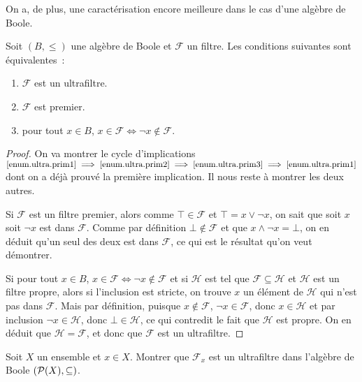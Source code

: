 On a, de plus, une caractérisation encore meilleure dans le cas d'une algèbre de
Boole.

\begin{proposition}
  Soit $(B,\leq)$ une algèbre de Boole et $\mathcal F$ un filtre. Les conditions
  suivantes sont équivalentes~:
  \begin{enumerate}[label=(\roman*)]
  \item \label{enum.ultra.prim1} $\mathcal F$ est un ultrafiltre.
  \item \label{enum.ultra.prim2} $\mathcal F$ est premier.
  \item \label{enum.ultra.prim3} pour tout $x\in B$,
    $x\in \mathcal F \iff \lnot x \notin\mathcal F$.
  \end{enumerate}
\end{proposition}

\begin{proof}
  On va montrer le cycle d'implications
  $\ref{enum.ultra.prim1} \implies\ref{enum.ultra.prim2}
  \implies\ref{enum.ultra.prim3}\implies\ref{enum.ultra.prim1}$
  dont on a déjà prouvé la première implication. Il nous reste à montrer les
  deux autres.
  
  Si $\mathcal F$ est un filtre premier, alors comme $\top \in \mathcal F$ et
  $\top = x \lor \lnot x$, on sait que soit $x$ soit $\lnot x$ est dans
  $\mathcal F$. Comme par définition $\bot\notin\mathcal F$ et que
  $x\land\lnot x = \bot$, on en déduit qu'un seul des deux est dans
  $\mathcal F$, ce qui est le résultat qu'on veut démontrer.

  Si pour tout $x\in B$, $x\in\mathcal F\iff\lnot x\notin\mathcal F$ et
  si $\mathcal H$ est tel que $\mathcal F\subseteq\mathcal H$ et $\mathcal H$
  est un filtre propre, alors si l'inclusion est stricte, on trouve $x$ un
  élément de $\mathcal H$ qui n'est pas dans $\mathcal F$. Mais par définition,
  puisque $x\notin\mathcal F$, $\lnot x\in\mathcal F$, donc $x\in \mathcal H$ et
  par inclusion $\lnot x \in \mathcal H$, donc $\bot\in \mathcal H$, ce qui
  contredit le fait que $\mathcal H$ est propre. On en déduit que
  $\mathcal H = \mathcal F$, et donc que $\mathcal F$ est un ultrafiltre.
\end{proof}

\begin{exercise}
  Soit $X$ un ensemble et $x\in X$. Montrer que $\mathcal F_x$ est un
  ultrafiltre dans l'algèbre de Boole $(\mathcal{P}(X),\subseteq)$.
\end{exercise}

